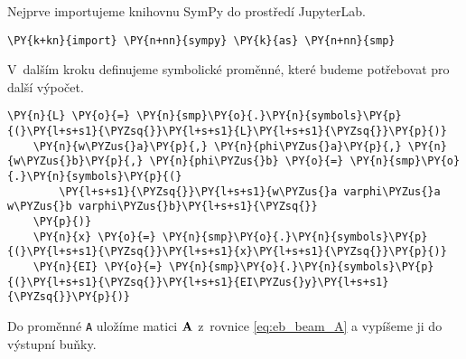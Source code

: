 Nejprve importujeme knihovnu SymPy do prostředí JupyterLab.

\begin{tcolorbox}[breakable, size=fbox, boxrule=1pt, pad at break*=1mm,colback=cellbackground, colframe=cellborder]
    \begin{Verbatim}[commandchars=\\\{\}]
    \PY{k+kn}{import} \PY{n+nn}{sympy} \PY{k}{as} \PY{n+nn}{smp}
    \end{Verbatim}
\end{tcolorbox}

V~dalším kroku definujeme symbolické proměnné, které budeme potřebovat pro další výpočet.

\begin{tcolorbox}[breakable, size=fbox, boxrule=1pt, pad at break*=1mm,colback=cellbackground, colframe=cellborder]
    \begin{Verbatim}[commandchars=\\\{\}]
    \PY{n}{L} \PY{o}{=} \PY{n}{smp}\PY{o}{.}\PY{n}{symbols}\PY{p}{(}\PY{l+s+s1}{\PYZsq{}}\PY{l+s+s1}{L}\PY{l+s+s1}{\PYZsq{}}\PY{p}{)}
    \PY{n}{w\PYZus{}a}\PY{p}{,} \PY{n}{phi\PYZus{}a}\PY{p}{,} \PY{n}{w\PYZus{}b}\PY{p}{,} \PY{n}{phi\PYZus{}b} \PY{o}{=} \PY{n}{smp}\PY{o}{.}\PY{n}{symbols}\PY{p}{(}
        \PY{l+s+s1}{\PYZsq{}}\PY{l+s+s1}{w\PYZus{}a varphi\PYZus{}a w\PYZus{}b varphi\PYZus{}b}\PY{l+s+s1}{\PYZsq{}}
    \PY{p}{)}
    \PY{n}{x} \PY{o}{=} \PY{n}{smp}\PY{o}{.}\PY{n}{symbols}\PY{p}{(}\PY{l+s+s1}{\PYZsq{}}\PY{l+s+s1}{x}\PY{l+s+s1}{\PYZsq{}}\PY{p}{)}
    \PY{n}{EI} \PY{o}{=} \PY{n}{smp}\PY{o}{.}\PY{n}{symbols}\PY{p}{(}\PY{l+s+s1}{\PYZsq{}}\PY{l+s+s1}{EI\PYZus{}y}\PY{l+s+s1}{\PYZsq{}}\PY{p}{)}
    \end{Verbatim}
\end{tcolorbox}
        
Do proměnné \texttt{A} uložíme matici $\mathbf{A}$ z~rovnice \ref{eq:eb_beam_A} a vypíšeme ji do výstupní buňky.

